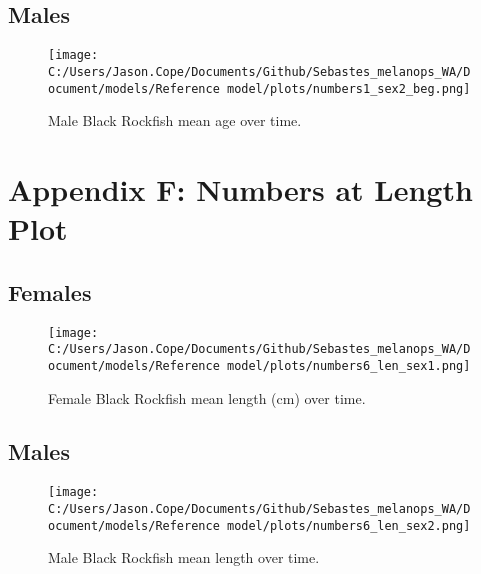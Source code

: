 \documentclass[11pt,
  english,
  letterpaper,
]{article}
\begin{document}
\hypertarget{males}{%
\subsection{Males}\label{males}}

\begin{figure}
\centering
\texttt{[image: C:/Users/Jason.Cope/Documents/Github/Sebastes\_melanops\_WA/Document/models/Reference model/plots/numbers1\_sex2\_beg.png]}
\caption{Male Black Rockfish mean age over time.\label{fig:num_age_males}}
\end{figure}

\clearpage

\hypertarget{app-f}{%
\section{Appendix F: Numbers at Length Plot}\label{app-f}}

\hypertarget{females-1}{%
\subsection{Females}\label{females-1}}

\begin{figure}
\centering
\texttt{[image: C:/Users/Jason.Cope/Documents/Github/Sebastes\_melanops\_WA/Document/models/Reference model/plots/numbers6\_len\_sex1.png]}
\caption{Female Black Rockfish mean length (cm) over time.\label{fig:num_lts_females}}
\end{figure}

\clearpage

\hypertarget{males-1}{%
\subsection{Males}\label{males-1}}

\begin{figure}
\centering
\texttt{[image: C:/Users/Jason.Cope/Documents/Github/Sebastes\_melanops\_WA/Document/models/Reference model/plots/numbers6\_len\_sex2.png]}
\caption{Male Black Rockfish mean length over time.\label{fig:num_lts_males}}
\end{figure}

\clearpage
\end{document}
